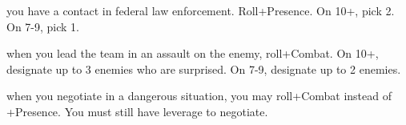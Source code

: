 \begin{dossier}
\begin{dossiermovebar}
 you have a contact in federal law enforcement. Roll+Presence. On 10+, pick
2. On 7-9, pick 1.
\begin{moveoptions}



\end{moveoptions}

 when you lead the team in an assault on the enemy, roll+Combat. On 10+,
designate up to 3 enemies who are surprised. On
7-9, designate up to 2 enemies.

 when you negotiate in a dangerous situation, you may
roll+Combat instead of +Presence. You must still have leverage to negotiate.

\end{dossiermovebar}%
\end{dossier}

